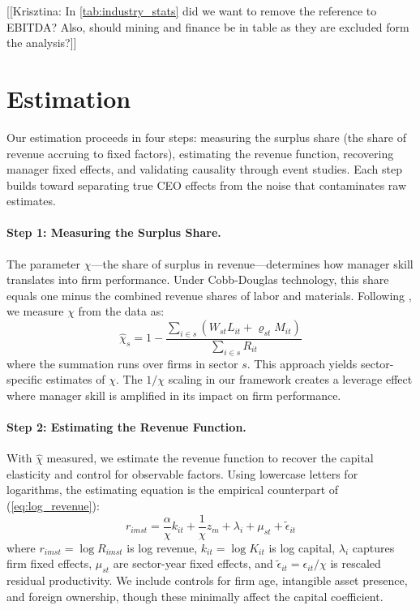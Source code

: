 \documentclass[11pt,a4paper]{article}
\begin{document}


[[Krisztina: In \ref{tab:industry_stats} did we want to remove the reference to EBITDA? Also, should mining and finance be in table as they are excluded form the analysis?]]

\section{Estimation}

Our estimation proceeds in four steps: measuring the surplus share (the share of revenue accruing to fixed factors), estimating the revenue function, recovering manager fixed effects, and validating causality through event studies. Each step builds toward separating true CEO effects from the noise that contaminates raw estimates.

\paragraph{Step 1: Measuring the Surplus Share.} The parameter $\chi$---the share of surplus in revenue---determines how manager skill translates into firm performance. Under Cobb-Douglas technology, this share equals one minus the combined revenue shares of labor and materials. Following \citet{Gandhi2020-nu}, we measure $\chi$ from the data as:
\begin{equation}
\hat{\chi}_s = 1 - \frac{\sum_{i \in s}(W_{st}L_{it} + \varrho_{st}M_{it})}{\sum_{i \in s} R_{it}}
\end{equation}
where the summation runs over firms in sector $s$. This approach yields sector-specific estimates of $\chi$. The $1/\chi$ scaling in our framework creates a leverage effect where manager skill is amplified in its impact on firm performance.

\paragraph{Step 2: Estimating the Revenue Function.} With $\hat{\chi}$ measured, we estimate the revenue function to recover the capital elasticity and control for observable factors. Using lowercase letters for logarithms, the estimating equation is the empirical counterpart of (\ref{eq:log_revenue}):
\begin{equation}
r_{imst} = \frac{\alpha}{\chi} k_{it} + \frac{1}{\chi}z_m + \lambda_i + \mu_{st} + \tilde{\epsilon}_{it}
\end{equation}
where $r_{imst} = \log R_{imst}$ is log revenue, $k_{it} = \log K_{it}$ is log capital, $\lambda_i$ captures firm fixed effects, $\mu_{st}$ are sector-year fixed effects, and $\tilde{\epsilon}_{it} = \epsilon_{it}/\chi$ is rescaled residual productivity. We include controls for firm age, intangible asset presence, and foreign ownership, though these minimally affect the capital coefficient.
\end{document}
